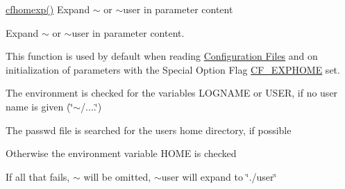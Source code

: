 \hyperlink{group__advanced__features_ga469258ed449ac26d5c82e665db491ff2}{cfhomexp()} Expand {\ttfamily $\sim$} or {\ttfamily $\sim$user} in parameter content 

Expand {\ttfamily $\sim$} or {\ttfamily $\sim$user} in parameter content.

This function is used by default when reading \hyperlink{config_files}{Configuration Files} and on initialization of parameters with the Special Option Flag \hyperlink{group__special__options__mask_gaff1b2e25aa9a89a55c1784018e24aa75}{C\-F\-\_\-\-E\-X\-P\-H\-O\-M\-E} set.


\begin{DoxyItemize}
\item The environment is checked for the variables {\ttfamily L\-O\-G\-N\-A\-M\-E} or {\ttfamily U\-S\-E\-R}, if no user name is given (\char`\"{}$\sim$/....\char`\"{})
\begin{DoxyItemize}
\item The {\ttfamily passwd} file is searched for the users home directory, if possible
\item Otherwise the environment variable {\ttfamily H\-O\-M\-E} is checked
\item If all that fails, {\ttfamily $\sim$} will be omitted, {\ttfamily $\sim$user} will expand to \char`\"{}./user\char`\"{}
\end{DoxyItemize}
\end{DoxyItemize}


